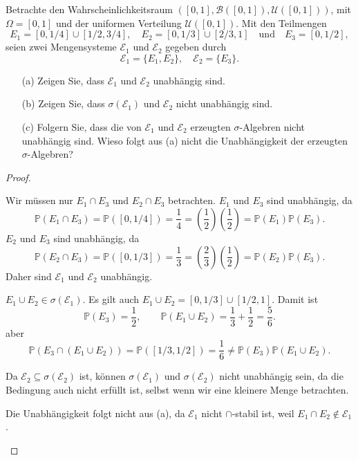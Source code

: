 \begin{Problem}
	Betrachte den Wahrscheinlichkeitsraum \(( [0, 1], \mathcal{B}([0, 1]), \mathcal{U}([0, 1]))\), mit \(\Omega = [0, 1]\) und der uniformen Verteilung \(\mathcal{U}([0, 1])\). Mit den Teilmengen 
	\[
	E_1 = [0, 1/4] \cup [1/2, 3/4], \quad E_2 = [0, 1/3] \cup [2/3, 1] \quad \text{und} \quad E_3 = [0, 1/2],
	\]
	seien zwei Mengensysteme \(\mathcal{E}_1\) und \(\mathcal{E}_2\) gegeben durch 
	\[
	\mathcal{E}_1 = \{E_1, E_2\}, \quad \mathcal{E}_2 = \{E_3\}.
	\]
	
	\begin{enumerate}
		\item[(a)] Zeigen Sie, dass \(\mathcal{E}_1\) und \(\mathcal{E}_2\) unabhängig sind.
		\item[(b)] Zeigen Sie, dass \(\sigma(\mathcal{E}_1)\) und \(\mathcal{E}_2\) nicht unabhängig sind.
		\item[(c)] Folgern Sie, dass die von \(\mathcal{E}_1\) und \(\mathcal{E}_2\) erzeugten \(\sigma\)-Algebren nicht unabhängig sind. Wieso folgt aus (a) nicht die Unabhängigkeit der erzeugten \(\sigma\)-Algebren?
	\end{enumerate}
\end{Problem}
\begin{proof}
	\begin{parts}
		\item Wir müssen nur $E_1\cap E_3$ und $E_2\cap E_3$ betrachten. $E_1$ und $E_3$ sind unabhängig, da
			\[
				\mathbb{P}(E_1\cap E_3)=\mathbb{P}([0,1 / 4]) = \frac{1}{4} = \left( \frac{1}{2} \right) \left( \frac{1}{2} \right) =\mathbb{P}(E_1)\mathbb{P}(E_3)
			.\] 
			$E_2$ und $E_3$ sind unabhängig, da
			\[
				\mathbb{P}(E_2\cap E_3) = \mathbb{P}([0, 1 / 3]) = \frac{1}{3}= \left( \frac{2}{3} \right) \left( \frac{1}{2} \right) =\mathbb{P}(E_2)\mathbb{P}(E_3)
			.\] 
			Daher sind $\mathcal{E}_1$ und $\mathcal{E}_2$ unabhängig.
		\item $E_1\cup E_2\in \sigma(\mathcal{E}_1)$. Es gilt auch $E_1\cup E_2 = [0,1 / 3] \cup [1 / 2, 1]$. Damit ist
			\[
				\mathbb{P}(E_3) = \frac{1}{2}, \qquad \mathbb{P}(E_1\cup E_2) = \frac{1}{3}+\frac{1}{2}=\frac{5}{6}
			.\]
			aber
			\[
				\mathbb{P}(E_3\cap(E_1\cup E_2)) = \mathbb{P}([1 / 3, 1 / 2]) = \frac{1}{6}\neq \mathbb{P}(E_3)\mathbb{P}(E_1\cup E_2)
			.\] 
		\item Da $\mathcal{E}_2\subseteq \sigma(\mathcal{E}_2)$ ist, können $\sigma(\mathcal{E}_1)$ und $\sigma(\mathcal{E}_2)$ nicht unabhängig sein, da die Bedingung auch nicht erfüllt ist, selbst wenn wir eine kleinere Menge betrachten.

Die Unabhängigkeit folgt nicht aus (a), da $\mathcal{E}_1$ nicht $\cap$-stabil ist, weil $E_1\cap E_2\not\in \mathcal{E}_1$.\qedhere
	\end{parts}
\end{proof}

